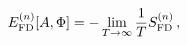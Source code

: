 \begin{equation}
E_{\rm FD}^{(n)}[A,\Phi]  =  
- \lim_{T \rightarrow \infty} \frac{1}{T}S_{\rm FD}^{(n)}\, , 
\end{equation}

